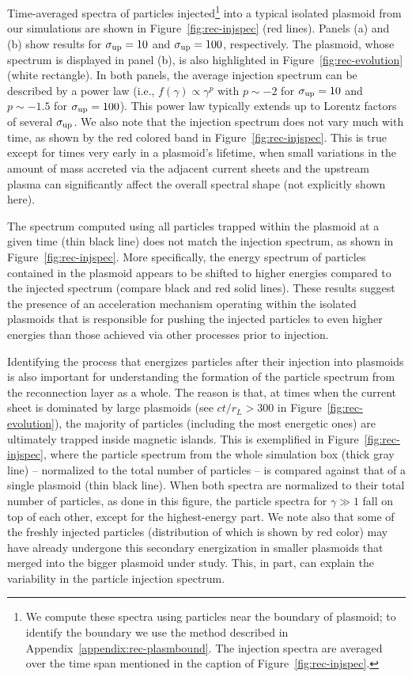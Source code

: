 Time-averaged spectra of particles injected\footnote{
We compute these spectra using particles near the boundary of plasmoid; to identify the boundary we use the method described in Appendix~\ref{appendix:rec-plasmbound}. The injection spectra are averaged over the time span mentioned in the caption of Figure~\ref{fig:rec-injspec}.} into a typical isolated plasmoid from our simulations are shown in Figure~\ref{fig:rec-injspec} (red lines). Panels (a) and (b) show results for $\sigma_{\rm up}=10$ and $\sigma_{\rm up}=100$, respectively. The plasmoid, whose spectrum is displayed in panel (b), is also highlighted in Figure~\ref{fig:rec-evolution} (white rectangle). In both panels, the average injection spectrum can be described by a power law (i.e., $f(\gamma)\propto\gamma^{p}$ with $p\sim -2$ for $\sigma_{\rm up}=10$ and $p\sim -1.5$ for $\sigma_{\rm up}=100$). This power law typically extends up to Lorentz factors of several $\sigma_{\rm up}$. We also note that the injection spectrum does not vary much with time, as shown  by the red colored band in Figure~\ref{fig:rec-injspec}. This is true except for times very early in a plasmoid's lifetime, when small variations in the amount of mass accreted via the adjacent current sheets and the upstream plasma can significantly affect the overall spectral shape (not explicitly shown here). 

The spectrum computed using all particles trapped within the plasmoid at a given time (thin black line) does not match the injection spectrum, as shown in Figure~\ref{fig:rec-injspec}. More specifically, the energy spectrum of particles contained in the plasmoid appears to be shifted to higher energies compared to the injected spectrum (compare black and red solid lines). These results suggest the presence of an acceleration mechanism operating within the isolated plasmoids that is responsible for pushing the injected particles to even higher energies than those achieved via other processes prior to injection. 

Identifying the process that energizes particles after their injection into plasmoids is also important for understanding the formation of the particle spectrum from the reconnection layer as a whole. The reason is that, at times when the current sheet is dominated by large plasmoids (see $ct/r_L > 300$ in Figure~\ref{fig:rec-evolution}), the majority of particles (including the most energetic ones) are ultimately trapped inside magnetic islands. This is exemplified in Figure~\ref{fig:rec-injspec}, where the particle spectrum from the whole simulation box (thick gray line) -- normalized to the total number of particles -- is compared against that of a single plasmoid (thin black line). When both spectra are normalized to their total number of particles, as done in this figure, the particle spectra for $\gamma \gg 1$ fall on top of each other, except for the highest-energy part. We note also that some of the freshly injected particles (distribution of which is shown by red color) may have already undergone this secondary energization in smaller plasmoids that merged into the bigger plasmoid under study. This, in part, can explain the variability in the particle injection spectrum.

